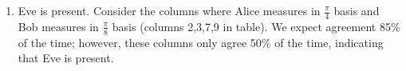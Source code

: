 \documentclass[12pt]{article}
\begin{document}
\begin{enumerate}[font=\bfseries]
    \item Eve is present. Consider the columns where Alice measures in $\frac{\pi}{4}$ basis and Bob measures in $\frac{\pi}{8}$ basis (columns 2,3,7,9 in table). We expect agreement 85\% of the time; however, these columns only agree 50\% of the time, indicating that Eve is present.
    
\end{enumerate}
\end{document}
